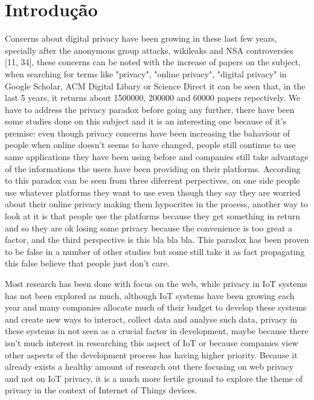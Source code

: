 \documentclass[conference]{IEEEtran}
\begin{document}
\section{Introdução}
Concerns about digital privacy have been growing in these last few
years, specially after the anonymous group attacks, wikileaks and NSA controversies [11, 34],
these concerns can be noted with the increase of papers on the subject,
when searching for terms like "privacy", "online privacy",
"digital privacy" in Google Scholar, ACM Digital Libary or Science Direct it
can be seen that, in the last 5 years, it returns about 1500000, 200000 and 60000
papers repectively.
We have to address the privacy paradox before going any further, there have been some studies
done on this subject and it is an interesting one because of it's premise:
even though privacy concerns have been increasing the bahaviour of people
when online doesn't seems to have changed, people still continue to use same
applications they have been using before and companies still take
advantage of the informations the users have been providing on their
platforms. According to \cite{} this paradox can be seen from three diferrent
perpectives, on one side people use whatever platforms they want to use
even though they say they are worried about their online privacy making them
hypocrites in the process, another way to look at it is that people use
the platforms because they get something in return and so they
are ok losing some privacy because the convenience is too great a factor, and 
the third perspective is this bla bla bla. This paradox has been proven
to be false in a number of other studies but some still take it as fact 
propagating this false believe that people just don't care.

Most research has been done with focus on the web, while privacy in IoT
systems has not been explored as much, although IoT systems have been
growing each year and many companies allocate much of their budget to
develop these systems and create new ways to interact, collect data and
analyse such data, privacy in these systems in not seen as a crucial
factor in development, maybe because there isn't much
interest in researching this aspect of IoT or because companies view other
aspects of the development process has having higher priority.
Because it already exists a healthy amount of research out there
focusing on web privacy and not on IoT privacy, it is a much more
fertile ground to explore the theme of privacy in the context of
Internet of Things devices.
\end{document}
